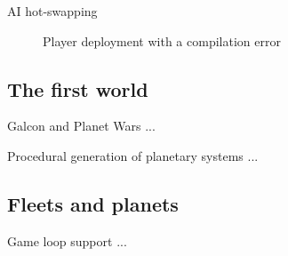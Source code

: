 \documentclass{beamer}
\begin{document}
\begin{frame}{AI hot-swapping}
\begin{figure}[H]
\caption{Player deployment with a compilation error}
\label{deploy_error}
\end{figure}
\end{frame}
\subsection{The first world}
\begin{frame}{Galcon and Planet Wars}
...
\end{frame}
\begin{frame}{Procedural generation of planetary systems}
...
\end{frame}
\subsection{Fleets and planets}
\begin{frame}{Game loop support}
...
\end{frame}
\end{document}
